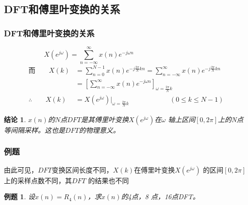 \documentclass[notheorems,compress,mathserif,table]{beamer}
\newtheorem{example}{例题}
\newtheorem{jielun}{结论}
\begin{document}
\subsection{DFT和傅里叶变换的关系}

\begin{frame}[shrink]\frametitle{DFT和傅里叶变换的关系}%
$$ X(e^{j\omega}) = \sum_{n=-\infty}^{\infty}x(n)e^{-j\omega n}\qquad\qquad\quad\quad\quad\quad\quad\quad\quad $$
\begin{equation*}
\begin{split}
\mbox{而}\qquad    X(k) &= \sum_{n=0}^{N-1}x(n)e^{-j\frac{2\pi}{N}kn}
          = \sum_{n=-\infty}^{\infty}x(n)e^{-j\frac{2\pi}{N}kn}\\
         &= \left[\sum_{n=-\infty}^{\infty}x(n) e^{-j\omega n}\right]_{\omega = \frac{2\pi}{N}k}   \\
\therefore \qquad    X(k) &= X(e^{j\omega})\Big|_{\omega = \frac{2\pi}{N}k} \qquad\qquad\qquad   (0 \leq k \leq N-1)
\end{split}
\end{equation*}
\begin{jielun}
{\heiti $x(n)$的$N$点$DFT$是其傅里叶变换$X(e^{j\omega})$在$\omega$ 轴上区间$[0,2\pi]$上的N点等间隔采样。这也是$DFT$的物理意义。}
\end{jielun}

\end{frame}
%
%
%
\begin{frame}[shrink]\frametitle{例题}%

由此可见，$DFT$变换区间长度不同，$X(k)$在傅里叶变换$X(e^{j\omega})$ 的区间$[0,2\pi]$上的采样点数不同，其$DFT$ 的结果也不同
\begin{example}
设$x(n)=R_4(n)$，求$x(n)$的4点，8 点，16点DFT。
\end{example}
\quad\newline\newline\newline\newline\newline\newline\newline\newline\newline\quad


\end{frame}
\end{document}
